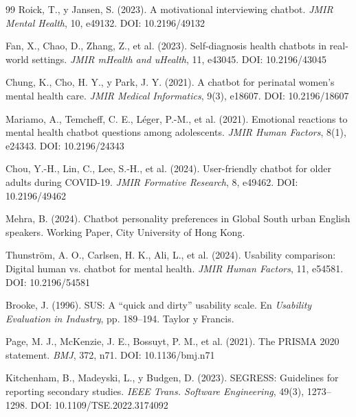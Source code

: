 \documentclass[11pt,twocolumn]{article}
\begin{document}
\begin{thebibliography}{99}
Roick, T., y Jansen, S. (2023). A motivational interviewing chatbot. \textit{JMIR Mental Health}, 10, e49132. DOI: 10.2196/49132

Fan, X., Chao, D., Zhang, Z., et al. (2023). Self-diagnosis health chatbots in real-world settings. \textit{JMIR mHealth and uHealth}, 11, e43045. DOI: 10.2196/43045

Chung, K., Cho, H. Y., y Park, J. Y. (2021). A chatbot for perinatal women's mental health care. \textit{JMIR Medical Informatics}, 9(3), e18607. DOI: 10.2196/18607

Mariamo, A., Temcheff, C. E., Léger, P.-M., et al. (2021). Emotional reactions to mental health chatbot questions among adolescents. \textit{JMIR Human Factors}, 8(1), e24343. DOI: 10.2196/24343

Chou, Y.-H., Lin, C., Lee, S.-H., et al. (2024). User-friendly chatbot for older adults during COVID-19. \textit{JMIR Formative Research}, 8, e49462. DOI: 10.2196/49462

Mehra, B. (2024). Chatbot personality preferences in Global South urban English speakers. Working Paper, City University of Hong Kong.

Thunström, A. O., Carlsen, H. K., Ali, L., et al. (2024). Usability comparison: Digital human vs. chatbot for mental health. \textit{JMIR Human Factors}, 11, e54581. DOI: 10.2196/54581

Brooke, J. (1996). SUS: A ``quick and dirty'' usability scale. En \textit{Usability Evaluation in Industry}, pp. 189--194. Taylor y Francis.

Page, M. J., McKenzie, J. E., Bossuyt, P. M., et al. (2021). The PRISMA 2020 statement. \textit{BMJ}, 372, n71. DOI: 10.1136/bmj.n71

Kitchenham, B., Madeyski, L., y Budgen, D. (2023). SEGRESS: Guidelines for reporting secondary studies. \textit{IEEE Trans. Software Engineering}, 49(3), 1273--1298. DOI: 10.1109/TSE.2022.3174092

\end{thebibliography}
\end{document}
